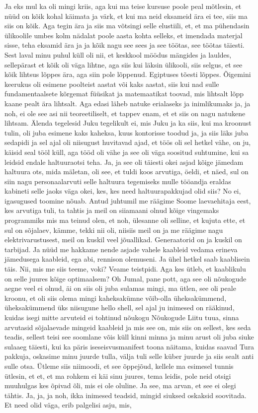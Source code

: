 Ja eks mul ka oli mingi kriis, aga kui ma teise kursuse poole peal mõtlesin, et nüüd on kõik kohal käimata ja värk, et kui ma neid eksameid ära ei tee, siis ma siis on kõik. Aga tegin ära ja siis ma võtsingi selle elustiili, et, et ma pühendasin ülikoolile umbes kolm nädalat poole aasta kohta selleks, et imendada materjal sisse, teha eksamid ära ja ja kõik nagu see sees ja see töötas, see töötas täiesti. Sest laval minu puhul küll oli nii, et keskkool möödus mängides ja lauldes, sellepärast et kõik oli väga lihtne, aga siis kui läksin ülikooli, siis selgus, et see kõik lihtsus lõppes ära, aga siin pole lõppenud. Egiptuses tõesti lõppes. Õigemini keerukus oli esimene poolteist aastat või kaks aastat, siis kui nad sulle fundamentaalsete kõrgemat füüsikat ja matemaatikat toovad, mis lihtsalt lõpp kaane pealt ära lihtsalt. Aga edasi läheb natuke erialaseks ja inimlikumaks ja, ja noh, ei ole see asi nii teoreetiliselt, et tappev enam, et et siis on nagu natukene lihtsam. Älenda tegelesid Juku tegelikult ei, mis Juku ja ka siis, kui ma kroonust tulin, oli juba esimene kaks kaheksa, kuus kontorisse toodud ja, ja siis läks juba sedapidi ja sel ajal oli niisugust huvitavad ajad, et töös oli sel hetkel vähe, on ju, käisid seal tööl küll, aga tööd oli vähe ja see oli väga soositud suhtumine, kui sa leidsid endale haltuuraotsi teha. Ja, ja see oli täiesti okei asjad kõige jämedam haltuura ots, mida mäletan, oli see, et tuldi koos arvutiga, öeldi, et näed, sul on siin nagu personaalarvuti selle haltuura tegemiseks mulle tööandja eraldas kabineti selle jaoks väga okei, kes, kes need haltuurapakkujad olid siis? No ei, igasugused toomine nõuab. Antud juhtumil me räägime Soome laevaehitaja eest, kes arvutiga tuli, ta tahtis ja meil on siiamaani olnud kõige vingemaks programmiks mis ma teinud olen, et noh, ülesanne oli selline, et kujuta ette, et sul on sõjalaev, kämme, tekki nii oli, niisiis meil on ja me räägime nagu elektrivarustusest, meil on kuskil veel jõuallikad. Generaatorid on ja kuskil on tarbijad. Ja nüüd me hakkame nende asjade vahele kaableid vedama erineva jämedusega kaableid, ega abi, rennison olemuseni. Ja ühel hetkel saab kaablisein täis. Nii, mis me siis teeme, voki? Veame teistpidi. Aga kes ütleb, et kaablikulu on selle juures kõige optimaalsem? Oh Jumal, pane pott, aga see oli nõukogude aegne veel ei olnud, äi on siis oli juba sulamas mingi, ma ütlen, see oli peale kroonu, et oli siis olema mingi kaheksakümne võib-olla üheksakümmend, üheksakümmend üks niisugune hello shell, sel ajal ju inimesed on rääkinud, kuidas isegi mitte arvuteid ei tohtinud nõukogu Nõukogude Liitu tuua, sinna arvutasid sõjalaevade mingeid kaableid ja mis see on, mis siis on sellest, kes seda teadis, sellest teisi see soomlane võis küll kinni minna ja minu arust oli juba siuke sulaaeg täiesti, kui ka päris iseseisvusmanifest toona näitama, kuidas saavad Tura pakkuja, oskasime minu juurde tulla, välja tuli selle küber juurde ja siis sealt anti sulle otsa. Ütleme siis niimoodi, et see õppejõud, kellele ma esimesel tunnis ütlesin, et et, et ma rohkem ei käi sinu juures, tema leidis, pole neid otsigi muuhulgas kes õpivad õli, mis ei ole oluline. Ja see, ma arvan, et see ei olegi tähtis. Ja, ja, ja noh, ikka inimesed teadsid, mingid siuksed oskaksid soovitada. Et need olid väga, erib palgelisi asju, mis, 